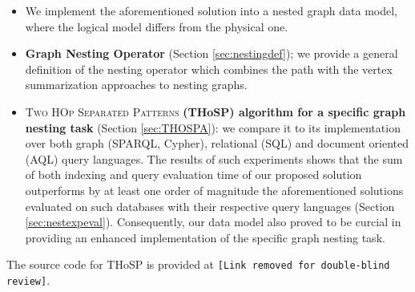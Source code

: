 \begin{itemize}
	\item We implement the aforementioned solution into a nested graph data model, where the logical model differs from the physical one.
	\item \textbf{Graph Nesting Operator} (Section \ref{sec:nestingdef}); we provide a general definition of the nesting operator which combines the path  with the vertex summarization approaches to nesting graphs.
	\item \textsc{{Two HOp Separated Patterns}} \textbf{(THoSP) algorithm for a specific graph nesting task} (Section \ref{sec:THOSPA}): we
	compare it to its implementation
	over both graph  (SPARQL, Cypher), relational (SQL) and document oriented (AQL) query languages. The results of such experiments shows that the sum of both indexing and query evaluation time of our proposed solution outperforms by at least one order of magnitude the aforementioned solutions evaluated on such databases with their respective query languages (Section \ref{sec:nestexpeval}). Consequently, our data model also proved to be curcial in providing an enhanced implementation of the specific graph nesting task.
\end{itemize}

The source code for THoSP is provided at \texttt{\color{red}[Link removed for double-blind review]}.
